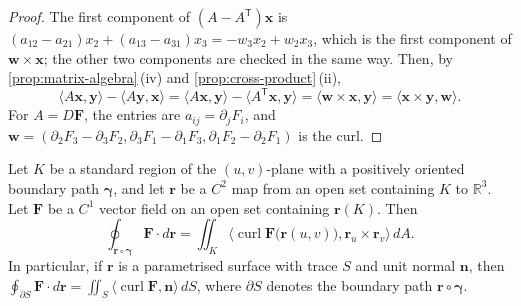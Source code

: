 \begin{proof}
The first component of $(A-A^{\mathsf T})\mathbf x$ is $(a_{12}-a_{21})x_2+(a_{13}-a_{31})x_3=-w_3x_2+w_2x_3$, which is the first component of $\mathbf w\times\mathbf x$; the other two components are checked in the same way. Then, by \cref{prop:matrix-algebra}\,(iv) and \cref{prop:cross-product}\,(ii),
\[
\langle A\mathbf x,\mathbf y\rangle-\langle A\mathbf y,\mathbf x\rangle=\langle A\mathbf x,\mathbf y\rangle-\langle A^{\mathsf T}\mathbf x,\mathbf y\rangle=\langle\mathbf w\times\mathbf x,\mathbf y\rangle=\langle\mathbf x\times\mathbf y,\mathbf w\rangle .
\]
For $A=D\mathbf F$, the entries are $a_{ij}=\partial_jF_i$, and $\mathbf w=(\partial_2F_3-\partial_3F_2,\partial_3F_1-\partial_1F_3,\partial_1F_2-\partial_2F_1)$ is the curl.
\end{proof}

\begin{theorem}
\label{thm:stokes}
Let $K$ be a standard region of the $(u,v)$-plane with a positively oriented boundary path $\boldsymbol\gamma$, and let $\mathbf r$ be a $C^2$ map from an open set containing $K$ to $\mathbb R^3$. Let $\mathbf F$ be a $C^1$ vector field on an open set containing $\mathbf r(K)$. Then
\[
\oint_{\mathbf r\circ\boldsymbol\gamma}\mathbf F\cdot d\mathbf r=\iint_K\bigl\langle\operatorname{curl}\mathbf F\bigl(\mathbf r(u,v)\bigr),\mathbf r_u\times\mathbf r_v\bigr\rangle\,dA .
\]
In particular, if $\mathbf r$ is a parametrised surface with trace $S$ and unit normal $\mathbf n$, then $\oint_{\partial S}\mathbf F\cdot d\mathbf r=\iint_S\langle\operatorname{curl}\mathbf F,\mathbf n\rangle\,dS$, where $\partial S$ denotes the boundary path $\mathbf r\circ\boldsymbol\gamma$.
\end{theorem}

